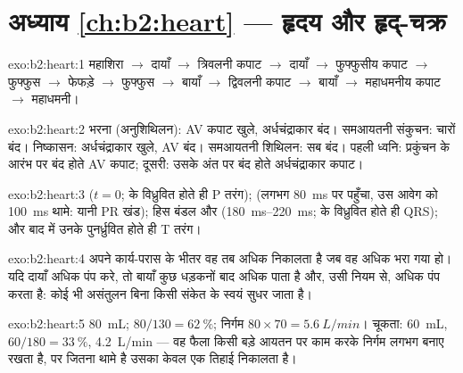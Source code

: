 \section*{अध्याय \ref{ch:b2:heart} --- हृदय और हृद्-चक्र}

\begin{solution}{exo:b2:heart:1}
महाशिरा $\to$ दायाँ  $\to$ त्रिवलनी कपाट $\to$ दायाँ
 $\to$ फुफ्फुसीय कपाट $\to$ फुफ्फुस  $\to$ फेफड़े
$\to$ फुफ्फुस  $\to$ बायाँ  $\to$ द्विवलनी कपाट $\to$ बायाँ
 $\to$ महाधमनीय कपाट $\to$ महाधमनी।
\end{solution}

\begin{solution}{exo:b2:heart:2}
भरना (अनुशिथिलन): AV कपाट खुले, अर्धचंद्राकार बंद। समआयतनी
संकुचन: चारों बंद। निष्कासन: अर्धचंद्राकार खुले, AV बंद।
समआयतनी शिथिलन: सब बंद। पहली ध्वनि: प्रकुंचन के आरंभ पर बंद
होते AV कपाट; दूसरी: उसके अंत पर बंद होते अर्धचंद्राकार
कपाट।
\end{solution}

\begin{solution}{exo:b2:heart:3}
 ($t = 0$;  के विध्रुवित होते ही P तरंग);
 (लगभग \qty{80}{ms} पर पहुँचा, उस आवेग को
\qty{100}{ms} थामे: यानी PR खंड); हिस बंडल और
 (\qtyrange{180}{220}{ms};  के विध्रुवित
होते ही QRS); और बाद में उनके पुनर्ध्रुवित होते ही T तरंग।
\end{solution}

\begin{solution}{exo:b2:heart:4}
अपने कार्य-परास के भीतर वह  तब अधिक निकालता है जब वह अधिक
भरा गया हो। यदि दायाँ  अधिक पंप करे, तो बायाँ कुछ धड़कनों बाद
अधिक पाता है और, उसी नियम से, अधिक पंप करता है: कोई भी
असंतुलन बिना किसी संकेत के स्वयं सुधर जाता है।
\end{solution}

\begin{solution}{exo:b2:heart:5}
 \qty{80}{mL};  $80/130 = \qty{62}{\%}$;
निर्गम $80\times 70 = \qty{5.6}{L/min}$। चूकता: \qty{60}{mL},
$60/180 = \qty{33}{\%}$, \qty{4.2}{L/min} --- वह फैला 
किसी बड़े आयतन पर काम करके निर्गम लगभग बनाए रखता है, पर जितना थामे है
उसका केवल एक तिहाई निकालता है।
\end{solution}

